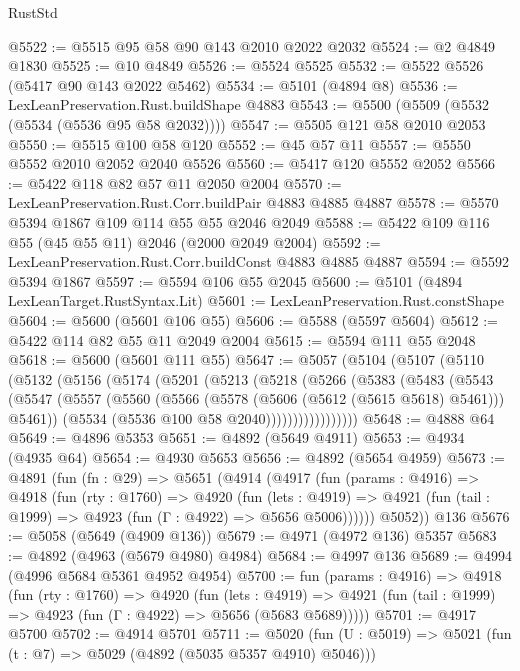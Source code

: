 \begin{lexlean}{RustStd}
\begin{coremodule}
@5522 := @5515 @95 @58 @90 @143 @2010 @2022 @2032
@5524 := @2 @4849 @1830
@5525 := @10 @4849
@5526 := @5524 @5525
@5532 := @5522 @5526 (@5417 @90 @143 @2022 @5462)
@5534 := @5101 (@4894 @8)
@5536 := LexLeanPreservation.Rust.buildShape @4883
@5543 := @5500 (@5509 (@5532 (@5534 (@5536 @95 @58 @2032))))
@5547 := @5505 @121 @58 @2010 @2053
@5550 := @5515 @100 @58 @120
@5552 := @45 @57 @11
@5557 := @5550 @5552 @2010 @2052 @2040 @5526
@5560 := @5417 @120 @5552 @2052
@5566 := @5422 @118 @82 @57 @11 @2050 @2004
@5570 := LexLeanPreservation.Rust.Corr.buildPair @4883 @4885 @4887
@5578 := @5570 @5394 @1867 @109 @114 @55 @55 @2046 @2049
@5588 := @5422 @109 @116 @55 (@45 @55 @11) @2046 (@2000 @2049 @2004)
@5592 := LexLeanPreservation.Rust.Corr.buildConst @4883 @4885 @4887
@5594 := @5592 @5394 @1867
@5597 := @5594 @106 @55 @2045
@5600 := @5101 (@4894 LexLeanTarget.RustSyntax.Lit)
@5601 := LexLeanPreservation.Rust.constShape
@5604 := @5600 (@5601 @106 @55)
@5606 := @5588 (@5597 @5604)
@5612 := @5422 @114 @82 @55 @11 @2049 @2004
@5615 := @5594 @111 @55 @2048
@5618 := @5600 (@5601 @111 @55)
@5647 := @5057
    (@5104
      (@5107
        (@5110
          (@5132
            (@5156
              (@5174
                (@5201
                  (@5213
                    (@5218
                      (@5266
                        (@5383
                          (@5483
                            (@5543
                              (@5547
                                (@5557
                                  (@5560 (@5566 (@5578 (@5606 (@5612 (@5615 @5618) @5461))) @5461))
                                  (@5534 (@5536 @100 @58 @2040)))))))))))))))))
@5648 := @4888 @64
@5649 := @4896 @5353
@5651 := @4892 (@5649 @4911)
@5653 := @4934 (@4935 @64)
@5654 := @4930 @5653
@5656 := @4892 (@5654 @4959)
@5673 := @4891
    (fun (fn : @29) =>
    @5651
      (@4914
        (@4917
          (fun (params : @4916) =>
          @4918
            (fun (rty : @1760) =>
            @4920
              (fun (lets : @4919) =>
              @4921 (fun (tail : @1999) => @4923 (fun (Γ : @4922) => @5656 @5006))))))
        @5052))
    @136
@5676 := @5058 (@5649 (@4909 @136))
@5679 := @4971 (@4972 @136) @5357
@5683 := @4892 (@4963 (@5679 @4980) @4984)
@5684 := @4997 @136
@5689 := @4994 (@4996 @5684 @5361 @4952 @4954)
@5700 := fun (params : @4916) =>
  @4918
    (fun (rty : @1760) =>
    @4920
      (fun (lets : @4919) =>
      @4921 (fun (tail : @1999) => @4923 (fun (Γ : @4922) => @5656 (@5683 @5689)))))
@5701 := @4917 @5700
@5702 := @4914 @5701
@5711 := @5020 (fun (U : @5019) => @5021 (fun (t : @7) => @5029 (@4892 (@5035 @5357 @4910) @5046)))

\end{coremodule}
\end{lexlean}
